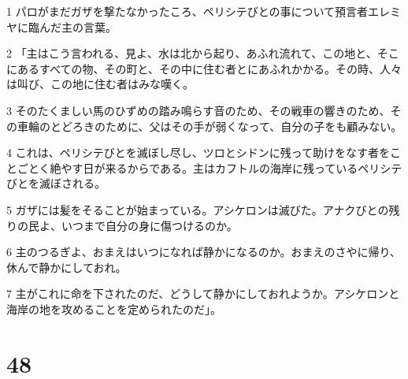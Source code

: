 \par 1 パロがまだガザを撃たなかったころ、ペリシテびとの事について預言者エレミヤに臨んだ主の言葉。
\par 2 「主はこう言われる、見よ、水は北から起り、あふれ流れて、この地と、そこにあるすべての物、その町と、その中に住む者とにあふれかかる。その時、人々は叫び、この地に住む者はみな嘆く。
\par 3 そのたくましい馬のひずめの踏み鳴らす音のため、その戦車の響きのため、その車輪のとどろきのために、父はその手が弱くなって、自分の子をも顧みない。
\par 4 これは、ペリシテびとを滅ぼし尽し、ツロとシドンに残って助けをなす者をことごとく絶やす日が来るからである。主はカフトルの海岸に残っているペリシテびとを滅ぼされる。
\par 5 ガザには髪をそることが始まっている。アシケロンは滅びた。アナクびとの残りの民よ、いつまで自分の身に傷つけるのか。
\par 6 主のつるぎよ、おまえはいつになれば静かになるのか。おまえのさやに帰り、休んで静かにしておれ。
\par 7 主がこれに命を下されたのだ、どうして静かにしておれようか。アシケロンと海岸の地を攻めることを定められたのだ」。

\chapter{48}

